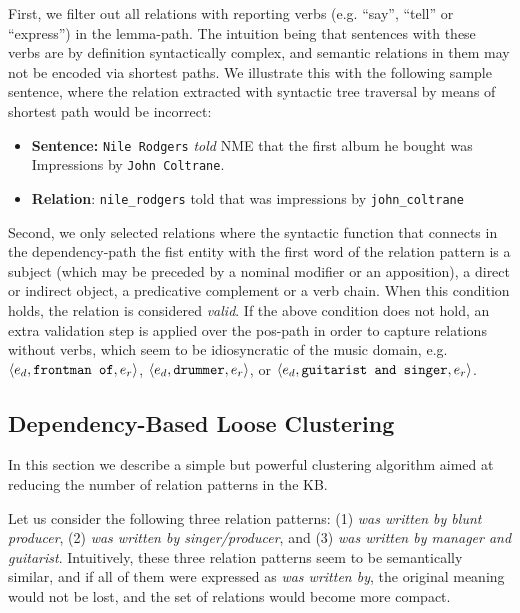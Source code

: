 First, we filter out all relations with reporting verbs (e.g. ``say'', ``tell'' or ``express'') in the lemma-path. The intuition being that sentences with these verbs are by definition syntactically complex, and semantic relations in them may not be encoded via shortest paths. We illustrate this with the following sample sentence, where the relation extracted with syntactic tree traversal by means of shortest path would be incorrect:

\begin{itemize}
\item[] \textbf{Sentence:} \texttt{Nile Rodgers} \textit{told} NME that the first album he bought was Impressions by \texttt{John Coltrane}.
\item[] \textbf{Relation}: \texttt{nile\_rodgers} told that was impressions by \texttt{john\_coltrane}
\end{itemize}

Second, we only selected relations where the syntactic function that connects in the dependency-path the fist entity with the first word of the relation pattern is a subject (which may be preceded by a nominal modifier or an apposition), a direct or indirect object, a predicative complement or a verb chain. When this condition holds, the relation is considered \textit{valid}. If the above condition does not hold, an extra validation step is applied over the pos-path in order to capture relations without verbs, which seem to be idiosyncratic of the music domain, e.g. $\langle e_d, \mbox{\texttt{frontman of}}, e_r \rangle$, $\langle e_d, \mbox{\texttt{drummer}}, e_r \rangle$, or $\langle e_d, \mbox{\texttt{guitarist and singer}}, e_r \rangle$.

\subsection{Dependency-Based Loose Clustering}
\label{sec:method:clustering}

In this section we describe a simple but powerful clustering algorithm aimed at reducing the number of relation patterns in the \textsc{KB}. %

Let us consider the following three relation patterns: (1) \textit{was written by blunt producer}, (2) \textit{was written by singer/producer}, and (3) \textit{was written by manager and guitarist}. Intuitively, these three relation patterns seem to be semantically similar, and if all of them were expressed as \textit{was written by}, the original meaning would not be lost, and the set of relations would become more compact.

